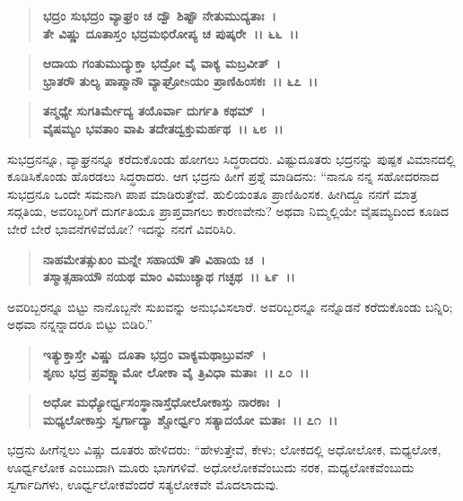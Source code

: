 \begin{verse}
\textbf{ಭದ್ರಂ ಸುಭದ್ರಂ ವ್ಯಾಘ್ರಂ ಚ ದ್ವೌ ಶಿಷ್ಟೌ ನೇತುಮುದ್ಯತಾಃ~।}\\\textbf{ತೇ ವಿಷ್ಣು ದೂತಾಸ್ತಂ ಭದ್ರಮಭಿರೋಪ್ಯ ಚ ಪುಷ್ಕರೇ~।। ೬೬~।। }
\end{verse}

\begin{verse}
\textbf{ಆದಾಯ ಗಂತುಮುದ್ಯುಕ್ತಾ ಭದ್ರೋ ವೈ ವಾಕ್ಯ ಮಬ್ರವೀತ್~।}\\\textbf{ಭ್ರಾತರೌ ತುಲ್ಯ ಪಾಪ್ಮಾನೌ ವ್ಯಾಘ್ರೋsಯಂ ಪ್ರಾಣಿಹಿಂಸಕಃ~।। ೬೭~।।} 
\end{verse}

\begin{verse}
\textbf{ತನ್ಮಧ್ಯೇ ಸುಗತಿರ್ಮೇದ್ಯ ತಯೊರ್ವಾ ದುರ್ಗತಿ ಕಥಮ್~।}\\\textbf{ವೈಷಮ್ಯಂ ಭವತಾಂ ವಾಪಿ ತದೇತದ್ವಕ್ತುಮರ್ಹಥ~।। ೬೮~।।}
\end{verse}

ಸುಭದ್ರನನ್ನೂ, ವ್ಯಾಘ್ರನನ್ನೂ ಕರೆದುಕೊಂಡು ಹೋಗಲು ಸಿದ್ಧರಾದರು. ವಿಷ್ಟುದೂತರು ಭದ್ರನನ್ನು ಪುಷ್ಪಕ ವಿಮಾನದಲ್ಲಿ ಕೂಡಿಸಿಕೊಂಡು ಹೊರಡಲು ಸಿದ್ಧರಾದರು. ಆಗ ಭದ್ರನು ಹೀಗೆ ಪ್ರಶ್ನೆ ಮಾಡಿದನು: “ನಾನೂ ನನ್ನ ಸಹೋದರನಾದ ಸುಭದ್ರನೂ ಒಂದೇ ಸಮನಾಗಿ ಪಾಪ ಮಾಡಿರುತ್ತೇವೆ. ಹುಲಿಯಂತೂ ಪ್ರಾಣಿಹಿಂಸಕ. ಹೀಗಿದ್ದೂ ನನಗೆ ಮಾತ್ರ ಸದ್ಗತಿಯ, ಅವರಿಬ್ಬರಿಗೆ ದುರ್ಗತಿಯೂ ಪ್ರಾಪ್ತವಾಗಲು ಕಾರಣವೇನು? ಅಥವಾ ನಿಮ್ಮಲ್ಲಿಯೇ ವೈಷಮ್ಯದಿಂದ ಕೂಡಿದ ಬೇರೆ ಬೇರೆ ಭಾವನೆಗಳಿವೆಯೋ? ಇದನ್ನು ನನಗೆ ವಿವರಿಸಿರಿ.

\begin{verse}
\textbf{ನಾಹಮೇತತ್ಸುಖಂ ಮನ್ನೇ ಸಹಾಯೌ ತೌ ವಿಹಾಯ ಚ~।}\\\textbf{ತಸ್ಮಾತ್ಸಹಾಯೌ ನಯಥ ಮಾಂ ವಿಮುಚ್ಯಾಥ ಗಚ್ಛಥ~।। ೬೯~।।}
\end{verse}

ಅವರಿಬ್ಬರನ್ನೂ ಬಿಟ್ಟು ನಾನೊಬ್ಬನೇ ಸುಖವನ್ನು ಅನುಭವಿಸಲಾರೆ. ಅವರಿಬ್ಬರನ್ನೂ ನನ್ನೊಡನೆ ಕರೆದುಕೊಂಡು ಬನ್ನಿರಿ; ಅಥವಾ ನನ್ನನ್ನಾದರೂ ಬಿಟ್ಟು ಬಿಡಿರಿ.”

\begin{verse}
\textbf{ಇತ್ಯುಕ್ತಾಸ್ತೇ ವಿಷ್ಣು ದೂತಾ ಭದ್ರಂ ವಾಕ್ಯಮಥಾಬ್ರುವನ್~।}\\\textbf{ಶೃಣು ಭದ್ರ ಪ್ರವಕ್ಷ್ಯಾಮೋ ಲೋಕಾ ವೈ ತ್ರಿವಿಧಾ ಮತಾಃ~।। ೭೦~।। }
\end{verse}

\begin{verse}
\textbf{ಅಧೋ ಮಧ್ಯೋರ್ಧ್ವಸಂಸ್ಥಾನಾಸ್ತೆಧೋಲೋಕಾಸ್ತು ನಾರಕಾಃ~।}\\\textbf{ಮಧ್ಯಲೋಕಾಸ್ತು ಸ್ವರ್ಗಾದ್ಯಾ ಶ್ಚೋರ್ಧ್ವಂ ಸತ್ಯಾದಯೋ ಮತಾಃ~।। ೭೧~।।}
\end{verse}

ಭದ್ರನು ಹೀಗೆನ್ನಲು ವಿಷ್ಣು ದೂತರು ಹೇಳಿದರು: “ಹೇಳುತ್ತೇವೆ, ಕೇಳು; ಲೋಕದಲ್ಲಿ ಅಧೋಲೋಕ, ಮಧ್ಯಲೋಕ, ಊರ್ಧ್ವಲೋಕ ಎಂಬುದಾಗಿ ಮೂರು ಭಾಗಗಳಿವೆ. ಅಧೋಲೋಕವೆಂಬುದು ನರಕ, ಮಧ್ಯಲೋಕವೆಂಬುದು ಸ್ವರ್ಗಾದಿಗಳು, ಊರ್ಧ್ವಲೋಕವೆಂದರೆ ಸತ್ಯಲೋಕವೇ ಮೊದಲಾದುವು.

